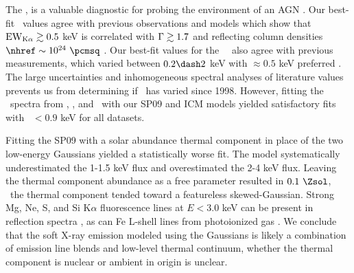 \documentclass[useAMS,usenatbib]{mn2e}
\begin{document}
The \fekaew, is a valuable diagnostic for probing the environment of
an AGN \citep[see][for a review]{2000PASP..112.1145F}. Our best-fit
\fekaew\ values agree with previous observations and models which show
that $\mathrm{EW}_{\mathrm{K}\alpha} \gtrsim 0.5$ keV is correlated with $\Gamma \gtrsim 1.7$ and
reflecting column densities $\nhref \sim 10^{24} ~\pcmsq$
\citep{1996MNRAS.280..823M, 1997ApJ...477..602N, 1999MNRAS.303L..11Z,
  2005A&A...444..119G}. Our best-fit values for the
\irs\ \fekaew\ also agree with previous measurements, which varied
between $0.2 \dash 2$ keV with $\approx 0.5$ keV preferred
\citep{2000A&A...353..910F, 2001MNRAS.321L..15I,
  2007A&A...473...85P}. The large uncertainties and inhomogeneous
spectral analyses of literature values prevents us from determining if
\fekaew\ has varied since 1998. However, fitting the \rf\ spectra from
\chandra, \xmm, and \bepposax\ with our SP09 and ICM models yielded
satisfactory fits with \fekaew\ $< 0.9$ keV for all datasets.

Fitting the SP09 with a solar abundance thermal component in place of
the two low-energy Gaussians yielded a statistically worse fit. The
model systematically underestimated the 1-1.5 keV flux and
overestimated the 2-4 keV flux. Leaving the thermal component
abundance as a free parameter resulted in $0.1 ~\Zsol$, \ie\ the
thermal component tended toward a featureless skewed-Gaussian. Strong
Mg, Ne, S, and Si K$\alpha$ fluorescence lines at $E < 3.0$ keV can be
present in reflection spectra \citep{1991MNRAS.249..352G}, as can Fe
L-shell lines from photoionized gas \citep{1990ApJ...362...90B}. We
conclude that the soft X-ray emission modeled using the Gaussians is
likely a combination of emission line blends and low-level thermal
continuum, whether the thermal component is nuclear or ambient in
origin is unclear.
\end{document}
